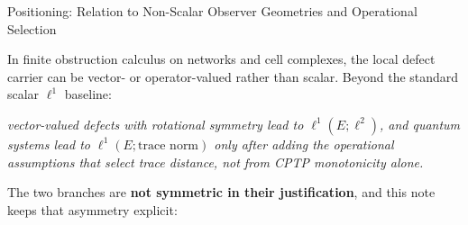 \documentclass[
  11pt,
]{article}
\renewenvironment{quote}
  {\begin{leftbar}\small}
  {\end{leftbar}}
\begin{document}
Positioning: Relation to Non-Scalar Observer Geometries and Operational Selection

In finite obstruction calculus on networks and cell complexes, the local defect carrier can be vector- or operator-valued rather than scalar. Beyond the standard scalar \(\ell^1\) baseline:

\begin{quote}
\emph{vector-valued defects with rotational symmetry lead to \(\ell^1(E;\ell^2)\), and quantum systems lead to \(\ell^1(E;\text{trace norm})\) only after adding the operational assumptions that select trace distance, not from CPTP monotonicity alone.}

The two branches are \textbf{not symmetric in their justification}, and this note keeps that asymmetry explicit:
\end{quote}
\end{document}
